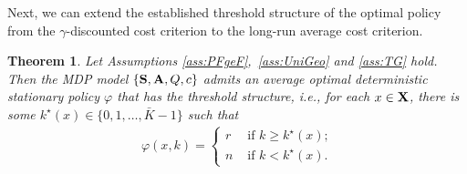 \documentclass[letterpaper,10pt,conference]{ieeeconf}  %
\newtheorem{theorem}{Theorem}
\begin{document}
\medskip
Next, we can extend the established {threshold} structure of the optimal policy from
the {$\gamma$-discounted cost} criterion to the long-run average {cost} criterion.
\medskip
\begin{theorem}
\label{thm:average_opt}
Let Assumptions \ref{ass:PFgeF},~\ref{ass:UniGeo} and \ref{ass:TG} hold. Then the MDP model $\{{\bf S},{\bf A},Q,c\}$ admits an average optimal deterministic stationary policy $\varphi$ that has the threshold structure, i.e., for each $x\in {\bf X}$, there is some $k^{\star}(x)\in\{0,1,\dots,\bar{K}-1\}$ such that 
\begin{align*}
\varphi(x,k)=\begin{cases}
r & \mbox{ if $k\ge k^{\star}(x)$;}\\
n & \mbox{ if $k<k^{\star}(x)$}.
\end{cases}
\end{align*}


\end{theorem} 
\medskip
\end{document}
